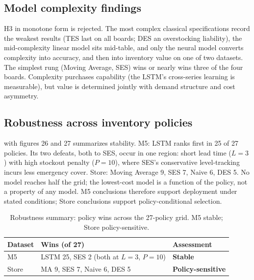\subsection{Model complexity findings}
\label{sec:complexity}
H3 in monotone form is rejected. The most complex classical specifications
record the weakest results (TES last on all boards; DES an overstocking
liability), the mid-complexity linear model sits mid-table, and only the
neural model converts complexity into accuracy, and then into inventory value
on one of two datasets. The simplest rung (Moving Average, SES) wins or
nearly wins three of the four boards. Complexity purchases capability (the
LSTM's cross-series learning is measurable), but value is determined jointly
with demand structure and cost asymmetry.

\subsection{Robustness across inventory policies}
\label{sec:robust}
 with figures 26 and 27 summarizes
stability. M5: LSTM ranks first in 25 of 27 policies. Its two defeats, both
to SES, occur in one region: short lead time ($L=3$) with high stockout
penalty ($P=10$), where SES's conservative level-tracking incurs less
emergency cover. Store: Moving Average 9, SES 7, Naive 6, DES 5. No model
reaches half the grid; the lowest-cost model is a function of the policy, not
a property of any model. M5 conclusions therefore support deployment under
stated conditions; Store conclusions support policy-conditional selection.

\begin{table}[H]
\centering
\caption{Robustness summary: policy wins across the 27-policy grid. M5 stable; Store policy-sensitive.}
\label{tab:robust}
\begin{tabular}{lll}
\toprule
Dataset & Wins (of 27) & Assessment \\
\midrule
M5 & LSTM 25, SES 2 (both at $L{=}3$, $P{=}10$) & \textbf{Stable} \\
Store & MA 9, SES 7, Naive 6, DES 5 & \textbf{Policy-sensitive} \\
\bottomrule
\end{tabular}
\end{table}

